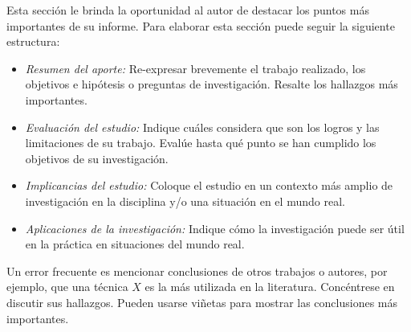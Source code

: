 Esta sección le brinda la oportunidad al autor de destacar los puntos más importantes de su informe. Para elaborar esta sección puede seguir la siguiente estructura:

\begin{itemize}
  \item \textit{Resumen del aporte:} Re-expresar brevemente el trabajo realizado, los objetivos e hipótesis o preguntas de investigación. Resalte los hallazgos más importantes.
  \item \textit{Evaluación del estudio:} Indique cuáles considera que son los logros y las limitaciones de su trabajo. Evalúe hasta qué punto se han cumplido los objetivos de su investigación.
  \item \textit{Implicancias del estudio:} Coloque el estudio en un contexto más amplio de investigación en la disciplina y/o una situación en el mundo real.
  \item \textit{Aplicaciones de la investigación:} Indique cómo la investigación puede ser útil en la práctica en situaciones del mundo real.
\end{itemize}

Un error frecuente es mencionar conclusiones de otros trabajos o autores, por ejemplo, que una técnica $X$ es la más utilizada en la literatura. Concéntrese en discutir sus hallazgos. Pueden usarse viñetas para mostrar las conclusiones más importantes.
